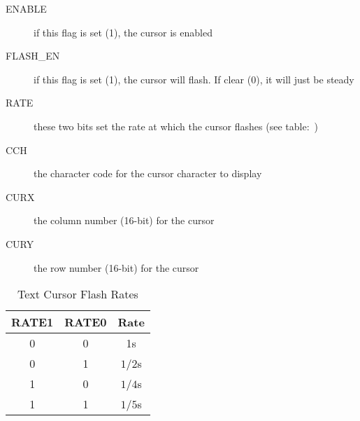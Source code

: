 \begin{description}
    \item[ENABLE] if this flag is set (1), the cursor is enabled

    \item[FLASH\_EN] if this flag is set (1), the cursor will flash. If clear (0), it will just be steady

    \item[RATE] these two bits set the rate at which the cursor flashes (see table:~\label{tab:txt_crsr_rates})

    \item[CCH] the character code for the cursor character to display

    \item[CURX] the column number (16-bit) for the cursor

    \item[CURY] the row number (16-bit) for the cursor
\end{description}

\begin{table}[h]
    \begin{center}
        \begin{tabular}{|c|c|c|} \hline
            RATE1 & RATE0 & Rate \\\hline\hline
            0 & 0 & 1s \\ \hline
            0 & 1 & $1/2$s \\ \hline
            1 & 0 & $1/4$s \\ \hline
            1 & 1 & $1/5$s \\ \hline
        \end{tabular}
    \end{center}
    \caption{Text Cursor Flash Rates}
    \label{tab:txt_crsr_rates}
\end{table}
